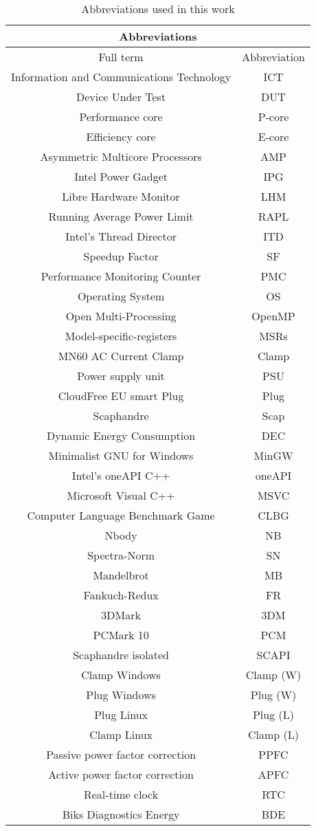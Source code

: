 \begin{table}[H]
    \centering
    \begin{tabular}{|| c | c ||}
    \hline
    \multicolumn{2}{||c||}{Abbreviations} \\ [0.5ex] \hline\hline
    Full term & Abbreviation \\\hline
    Information and Communications Technology & ICT \\
    Device Under Test & DUT \\
    Performance core & P-core \\
    Efficiency core & E-core\\
    Asymmetric Multicore Processors & AMP \\
    Intel Power Gadget & IPG \\
    Libre Hardware Monitor & LHM \\
    Running Average Power Limit & RAPL \\
    Intel's Thread Director & ITD\\
    Speedup Factor & SF\\
    Performance Monitoring Counter & PMC\\
    Operating System & OS \\
    Open Multi-Processing & OpenMP\\
    Model-specific-registers & MSRs \\
    MN60 AC Current Clamp & Clamp\\
    Power supply unit & PSU \\
    CloudFree EU smart Plug & Plug \\
    Scaphandre & Scap \\
    Dynamic Energy Consumption & DEC \\
    Minimalist GNU for Windows & MinGW \\
    Intel's oneAPI C++ & oneAPI \\
    Microsoft Visual C++ & MSVC \\
    Computer Language Benchmark Game  & CLBG \\
    Nbody & NB \\
    Spectra-Norm & SN \\
    Mandelbrot& MB \\
    Fankuch-Redux& FR \\
    3DMark  & 3DM \\
    PCMark 10  & PCM \\
    Scaphandre isolated  & SCAPI \\
    Clamp Windows & Clamp (W) \\
    Plug Windows & Plug (W) \\
    Plug Linux & Plug (L) \\
    Clamp Linux& Clamp (L) \\
    Passive power factor correction & PPFC  \\
    Active power factor correction & APFC \\
    Real-time clock & RTC \\
    Biks Diagnostics Energy & BDE \\ 

    \hline
    \end{tabular}
    \caption{Abbreviations used in this work}
    \label{tab:abbreviations}
\end{table}